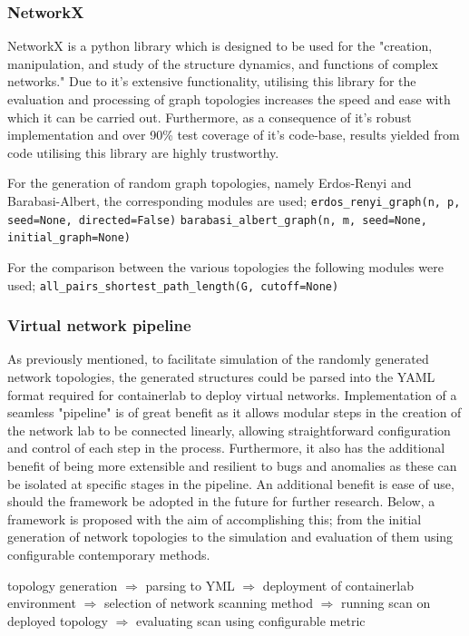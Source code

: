 \subsubsection{NetworkX}
NetworkX is a python library which is designed to be used for the "creation, manipulation, and study of the structure dynamics, and functions of complex networks." \cite{networkX} Due to it's extensive functionality, utilising this library for the evaluation and processing of graph topologies increases the speed and ease with which it can be carried out. Furthermore, as a consequence of it's robust implementation and over 90\% test coverage of it's code-base, results yielded from code utilising this library are highly trustworthy. 

For the generation of random graph topologies, namely Erdos-Renyi and Barabasi-Albert, the corresponding modules are used; \newline
\verb|erdos_renyi_graph(n, p, seed=None, directed=False)| 
\verb|barabasi_albert_graph(n, m, seed=None, initial_graph=None)| 

For the comparison between the various topologies the following modules were used; \newline 
\verb|all_pairs_shortest_path_length(G, cutoff=None)|

\subsubsection{Virtual network pipeline}
As previously mentioned, to facilitate simulation of the randomly generated network topologies, the generated structures could be parsed into the YAML format required for containerlab to deploy virtual networks. Implementation of a seamless "pipeline" is of great benefit as it allows modular steps in the creation of the network lab to be connected linearly, allowing straightforward configuration and control of each step in the process. Furthermore, it also has the additional benefit of being more extensible and resilient to bugs and anomalies as these can be isolated at specific stages in the pipeline. An additional benefit is ease of use, should the framework be adopted in the future for further research. Below, a framework is proposed with the aim of accomplishing this; from the initial generation of network topologies to the simulation and evaluation of them using configurable contemporary methods. 

topology generation $\Rightarrow$ parsing to YML $\Rightarrow$ deployment of containerlab environment $\Rightarrow$ selection of network scanning method $\Rightarrow$ running scan on deployed topology $\Rightarrow$ evaluating scan using configurable metric 

